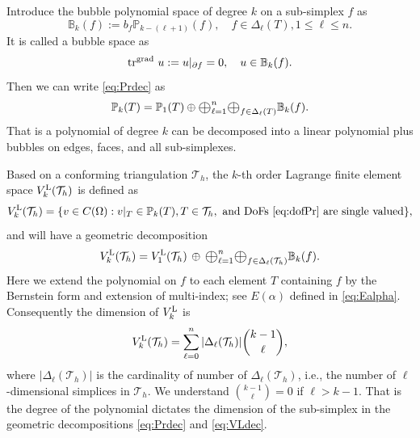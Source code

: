 \documentclass[mathpazo]{cicp}
\newcommand{\Oplus}{\ensuremath{\vcenter{\hbox{\scalebox{1.5}{$\oplus$}}}}}
\begin{document}
Introduce the bubble polynomial space of degree $k$ on a sub-simplex $f$ as
$$
\mathbb B_{k}( f) := b_f\mathbb P_{k - (\ell +1)} (f), \quad f\in \Delta_{\ell}(T), 1\leq \ell \leq n.
$$
It is called a bubble space as
$$
\operatorname{tr}^{{\rm grad\,}} u := u|_{\partial f} = 0, \quad u\in \mathbb B_{k}( f).
$$
Then we can write \eqref{eq:Prdec} as
\begin{equation}\label{eq:Lagdecbubble}
\mathbb P_k(T) = \mathbb P_1(T)\oplus \Oplus_{\ell = 1}^n\Oplus_{f\in \Delta_{\ell}(T)} \mathbb B_{k}( f).
\end{equation}
That is a polynomial of degree $k$ can be decomposed into a linear polynomial plus bubbles on edges, faces, and all sub-simplexes. 

Based on a conforming triangulation $\mathcal T_h$, the $k$-th order Lagrange finite element space $V_k^{\rm L}(\mathcal T_h)$ is defined as 
$$
V_k^{\rm L}(\mathcal T_h) = \{ v\in C(\Omega): v|_{T}\in \mathbb P_k(T),  T\in \mathcal T_h, \text{ and DoFs \eqref{eq:dofPr} are single valued}\},
$$
and will have a geometric decomposition
\begin{equation}\label{eq:VLdec}
V_k^{\rm L}(\mathcal T_h) = V_1^{\rm L}(\mathcal T_h) \,\oplus\, \Oplus_{\ell = 1}^n \Oplus_{f\in \Delta_{\ell}(\mathcal T_h)} \mathbb B_k(f).
\end{equation}
Here we extend the polynomial on $f$ to each element $T$ containing $f$ by the Bernstein form and extension of multi-index; see $E(\alpha)$ defined in \eqref{eq:Ealpha}. Consequently the dimension of $V_k^{\rm L}$ is
$$
V_k^{\rm L}(\mathcal T_h) = \sum_{\ell = 0}^n |\Delta_{\ell}(\mathcal T_h)| { k - 1 \choose \ell},
$$
where $|\Delta_{\ell}(\mathcal T_h)|$ is the cardinality of  number of $\Delta_{\ell}(\mathcal T_h)$, i.e., the number of $\ell$-dimensional simplices in $\mathcal T_h$. We understand ${ k - 1 \choose \ell} = 0$ if $\ell > k-1$. That is the degree of the polynomial dictates the dimension of the sub-simplex in the geometric decompositions \eqref{eq:Prdec} and \eqref{eq:VLdec}. 

\end{document}
